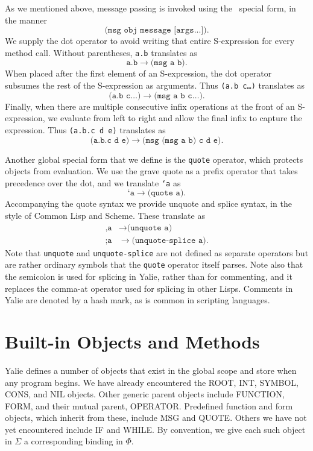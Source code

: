 \documentclass[twocolumn]{article}
\begin{document}
As we mentioned above, message passing is invoked using the \msg\
special form, in the manner
\[\texttt{(msg obj message [args...])}.\]
We supply the dot operator to avoid writing that entire
S-expression for every method call. Without parentheses, \texttt{a.b}
translates as
\[\texttt{a.b}\rightarrow\texttt{(msg a b)}.\]
When placed after the first element of an S-expression, the dot
operator subsumes the rest of the S-expression as arguments. Thus
\texttt{(a.b c\ldots)}  translates as
\[\texttt{(a.b c\ldots)} \rightarrow \texttt{(msg a b c\ldots)}.\]
Finally, when there are multiple consecutive infix operations at the
front of an S-expression, we evaluate from left to right and allow the
final infix to capture the expression. Thus \texttt{(a.b.c d e)}
translates as
\[ \texttt{(a.b.c d e)} \rightarrow \texttt{(msg (msg a b) c d e)}.\]

Another global special form that we define is the \texttt{quote}
operator, which protects objects from evaluation. We use the grave
quote as a prefix operator that takes precedence over the dot, and we
translate \texttt{`a} as
\[ \texttt{`a} \rightarrow \texttt{(quote a)}.\]
Accompanying the quote syntax we provide unquote and splice syntax, in
the style of Common Lisp and Scheme. These translate as
\begin{align*}
  \texttt{,a} & \rightarrow \texttt{(unquote a)}\\
  \texttt{;a} & \rightarrow \texttt{(unquote-splice a)}.
\end{align*}
Note that \texttt{unquote} and \texttt{unquote-splice} are not defined
as separate operators but are rather ordinary symbols that the
\texttt{quote} operator itself parses. Note also that the semicolon is
used for splicing in Yalie, rather than for commenting, and it
replaces the comma-at operator used for splicing in other
Lisps. Comments in Yalie are denoted by a hash mark, as is common in
scripting languages.

\section*{Built-in Objects and Methods}

Yalie defines a number of objects that exist in the global scope and
store when any program begins. We have already encountered the
{\ptr ROOT}, {\ptr INT}, {\ptr SYMBOL}, {\ptr CONS}, and
{\ptr NIL} objects. Other generic parent objects include
{\ptr FUNCTION}, {\ptr FORM}, and their mutual parent,
{\ptr OPERATOR}. Predefined function and form objects, which inherit
from these, include {\ptr MSG} and {\ptr QUOTE}. Others we have
not yet encountered include {\ptr IF} and {\ptr WHILE}. By
convention, we give each such object in $\Sigma$ a corresponding
binding in $\Phi$.
\end{document}
